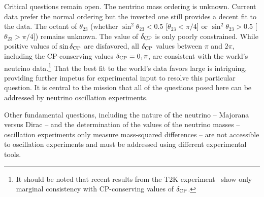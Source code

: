 Critical questions remain open. The neutrino mass ordering is unknown. Current data prefer the normal ordering but the inverted one still provides a decent fit to the data. The octant of $\theta_{23}$ (whether $\sin^2\theta_{23}<0.5$ [$\theta_{23}<\pi/4$] or $\sin^2\theta_{23}>0.5$ [$\theta_{23}>\pi/4$]) remains unknown. The value of $\delta_{\rm CP}$ is only poorly constrained. 
While positive values of $\sin\delta_{\rm CP}$ are disfavored, all $\delta_{\rm CP}$ values between $\pi$ and $2\pi$, including the CP-conserving values $\delta_{\rm CP}=0,\pi$, are consistent with the world's neutrino data.\footnote{It should be noted that recent results from the T2K experiment~\cite{Abe:2019vii} show only marginal consistency with CP-conserving values of $\delta_{\rm CP}$.} 
That the best fit to the world's data 
favors large  is intriguing, providing further impetus 
for experimental input to resolve this particular question.
It is central to the  mission that all of the questions 
posed here can be addressed 
by neutrino oscillation experiments.

Other fundamental questions, including the nature of the neutrino -- Majorana versus Dirac -- and the determination of the values of the neutrino masses -- oscillation experiments only measure mass-squared differences -- are not accessible to oscillation experiments and must be addressed using different experimental tools.  

